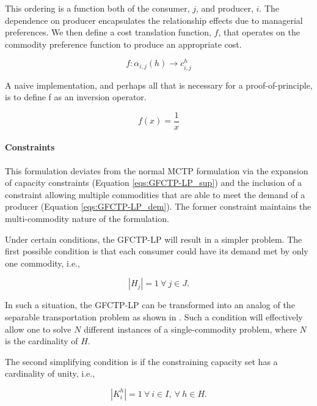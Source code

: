 This ordering is a function both of the consumer, $j$, and producer, $i$. The
dependence on producer encapsulates the relationship effects due to managerial
preferences. We then define a cost translation function, $f$, that operates on
the commodity preference function to produce an appropriate cost.

\begin{equation}
f : \alpha_{i,j}(h) \to c_{i,j}^{h}
\end{equation}

A naive implementation, and perhaps all that is necessary for a
proof-of-principle, is to define f as an inversion operator.

\begin{equation}
f(x) = \frac{1}{x}
\end{equation}

\paragraph{Constraints}
This formulation deviates from the normal MCTP formulation via the expansion of
capacity constraints (Equation \ref{eqs:GFCTP-LP_sup}) and the inclusion of a
constraint allowing multiple commodities that are able to meet the demand of a
producer (Equation \ref{eqs:GFCTP-LP_dem}). The former constraint maintains the
multi-commodity nature of the formulation. 

Under certain conditions, the GFCTP-LP will result in a simpler problem. The
first possible condition is that each consumer could have its demand met by only
one commodity, i.e.,

\begin{equation}\label{eqs:1demand}
  \left|{H_{j}}\right| = 1 \: \forall \: j \in J.
\end{equation}

In such a situation, the GFCTP-LP can be transformed into an analog of the
separable transportation problem as shown in \cite{bertsekas_network_1998}. Such
a condition will effectively allow one to solve $N$ different instances of a
single-commodity problem, where $N$ is the cardinality of $H$. 

The second simplifying condition is if the constraining capacity set has a
cardinality of unity, i.e., 

\begin{equation}\label{eqs:1constraint}
  \left|{K_{i}^{h}}\right| = 1 \: \forall \: i \in I, \: \forall \: h \in H.
\end{equation}


